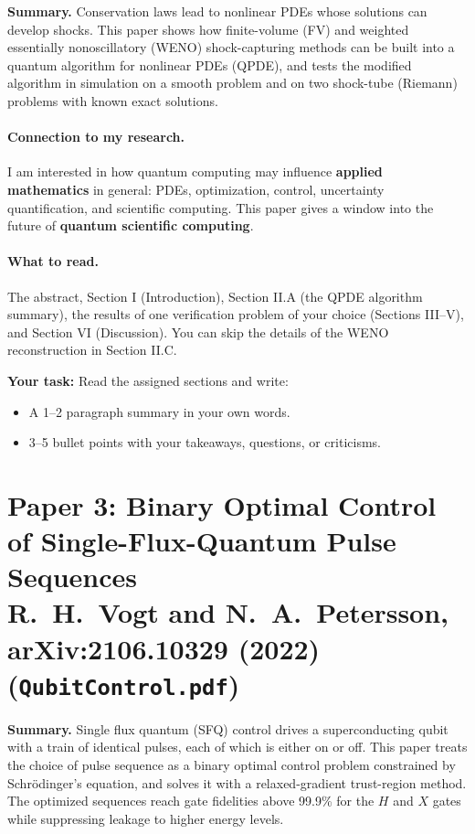\documentclass[11pt]{article}
\newenvironment{summary}{\par\noindent\textbf{Summary.} }{\par}
\newcommand{\yourtask}[1]{%
  \vspace{0.5em}
  \noindent\textbf{Your task:} #1
  \begin{itemize}
    \item A 1--2 paragraph summary in your own words.
    \item 3--5 bullet points with your takeaways, questions, or criticisms.
  \end{itemize}}
\begin{document}
\begin{summary}
Conservation laws lead to nonlinear PDEs whose solutions can develop shocks. This paper shows how
finite-volume (FV) and weighted essentially nonoscillatory (WENO) shock-capturing methods can be
built into a quantum algorithm for nonlinear PDEs (QPDE), and tests the modified algorithm in
simulation on a smooth problem and on two shock-tube (Riemann) problems with known exact solutions.
\end{summary}

\paragraph{Connection to my research.}
I am interested in how quantum computing may influence \textbf{applied mathematics} in general:
PDEs, optimization, control, uncertainty quantification, and scientific computing. This paper gives
a window into the future of \textbf{quantum scientific computing}. \smiley{}

\paragraph{What to read.}
The abstract, Section I (Introduction), Section II.A (the QPDE algorithm summary), the results of
one verification problem of your choice (Sections III--V), and Section VI (Discussion). You can skip
the details of the WENO reconstruction in Section II.C.

\yourtask{Read the assigned sections and write:}

\newpage

\section*{Paper 3: Binary Optimal Control of Single-Flux-Quantum Pulse Sequences\\
\small{R.~H.~Vogt and N.~A.~Petersson, arXiv:2106.10329 (2022) \quad (\texttt{QubitControl.pdf})}}

\begin{summary}
Single flux quantum (SFQ) control drives a superconducting qubit with a train of identical pulses,
each of which is either on or off. This paper treats the choice of pulse sequence as a binary optimal
control problem constrained by Schr\"odinger's equation, and solves it with a relaxed-gradient
trust-region method. The optimized sequences reach gate fidelities above 99.9\% for the $H$ and $X$
gates while suppressing leakage to higher energy levels.
\end{summary}
\end{document}
